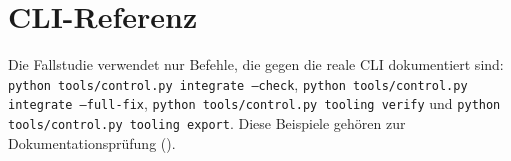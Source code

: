\section{CLI-Referenz}
\label{app:cli-reference}

Die Fallstudie verwendet nur Befehle, die gegen die reale CLI dokumentiert sind:
\texttt{python tools/control.py integrate --check}, \texttt{python tools/control.py
integrate --full-fix}, \texttt{python tools/control.py tooling verify} und
\texttt{python tools/control.py tooling export}. Diese Beispiele gehören zur
\Verified{} Dokumentationsprüfung ().
